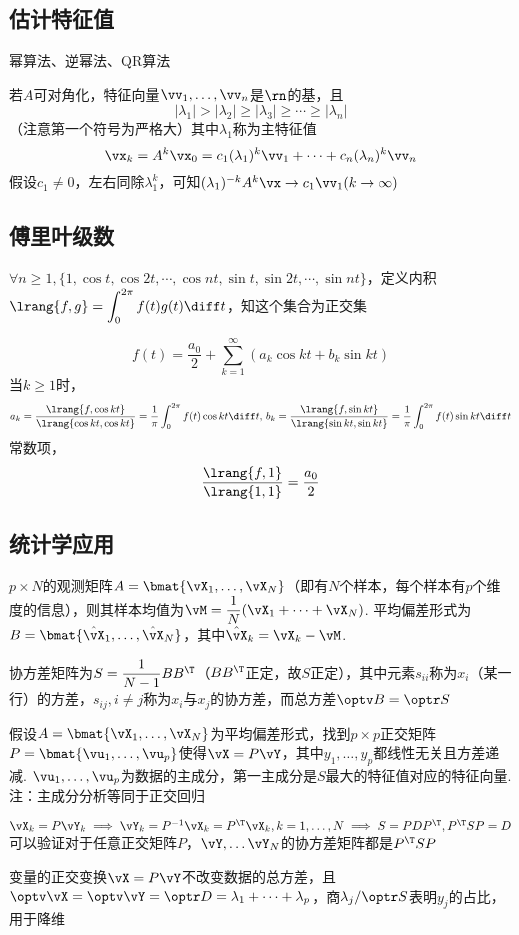 \subsection{估计特征值}%
幂算法、逆幂法、QR算法
\par 若$A$可对角化，特征向量$\vv_1,\dots,\vv_n$是$\rn$的基，且
\[|\lambda_1|>|\lambda_2|\geq|\lambda_3|\geq\cdots\geq|\lambda_n|\]
（注意第一个符号为严格大）其中$\lambda_1$称为主特征值
\[\vx_k=A^k\vx_0=c_1(\lambda_1)^k\vv_1+\cdots+c_n(\lambda_n)^k\vv_n\]
假设$c_1\ne 0$，左右同除$\lambda_1^k$，可知$(\lambda_1)^{-k}A^k\vx\to c_1\vv_1(k\to\infty)$

\subsection{傅里叶级数}%
$\forall n\geq 1,\{1,\cos t,\cos 2t,\cdots,\cos nt,\sin t,\sin 2t,\cdots,\sin nt\}$，定义内积$\lrang{f,g}=\displaystyle\int_0^{2\pi} f(t)g(t)\diff t$，知这个集合为正交集
\begin{theorem}
\[f(t)=\dfrac{a_0}{2}+\sum_{k=1}^\infty(a_k\cos kt+b_k\sin kt)\]
当$k\geq 1$时，
\[a_k=\dfrac{\lrang{f,\cos kt}}{\lrang{\cos kt,\cos kt}}=\dfrac{1}{\pi}\int_0^{2\pi}f(t)\cos kt\diff t,\,b_k=\dfrac{\lrang{f,\sin kt}}{\lrang{\sin kt,\sin kt}}=\dfrac{1}{\pi}\int_0^{2\pi}f(t)\sin kt\diff t\]
常数项，
\[\dfrac{\lrang{f,1}}{\lrang{1,1}}=\dfrac{a_0}{2}\]
\end{theorem}

\subsection{统计学应用}%
\begin{definition}[平均值]
$p\times N$的观测矩阵$A=\bmat{\vX_1,\ldots,\vX_N}$（即有$N$个样本，每个样本有$p$个维度的信息），则其样本均值为$\vM=\dfrac{1}{N}(\vX_1+\cdots+\vX_N)$. 平均偏差形式为$B=\bmat{\hat{\vX}_1,\ldots,\hat{\vX}_N}$，其中$\hat{\vX}_k=\vX_k-\vM$.
\end{definition}
\begin{definition}[方差]
协方差矩阵为$S=\dfrac{1}{N-1}BB^\T $（$BB^\T $正定，故$S$正定），其中元素$s_{ii}$称为$x_i$（某一行）的方差，$s_{ij},i\ne j$称为$x_i$与$x_j$的协方差，而总方差$\optv B=\optr S$
\end{definition}
\begin{definition}[主成分分析]
假设$A=\bmat{\vX_1,\ldots,\vX_N}$为平均偏差形式，找到$p\times p$正交矩阵$P=\bmat{\vu_1,\ldots,\vu_p}$使得$\vX=P\vY$，其中$y_1,\dots,y_p$都线性无关且方差递减. $\vu_1,\dots,\vu_p$为数据的主成分，第一主成分是$S$最大的特征值对应的特征向量.\\
注：主成分分析等同于正交回归
\end{definition}
\begin{analysis}
$\vX_k=P\vY_k\implies \vY_k=P^{-1}\vX_k=P^\T \vX_k,k=1,\dots,N\implies S=PDP^\T , P^\T SP=D$\\
可以验证对于任意正交矩阵$P$，$\vY,\dots\vY_N$的协方差矩阵都是$P^\T SP$
\end{analysis}
变量的正交变换$\vX=P\vY$不改变数据的总方差，且$\optv \vX=\optv \vY=\optr D=\lambda_1+\cdots+\lambda_p$，商$\lambda_j/\optr S$表明$y_j$的占比，用于降维